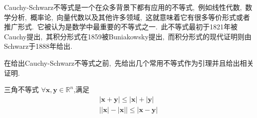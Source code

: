Cauchy-Schwarz不等式是一个在众多背景下都有应用的不等式,\ 例如线性代数,\ 数学分析,\ 概率论,\ 向量代数以及其他许多领域,\ 这就意味着它有很多等价形式或者推广形式.\ 它被认为是数学中最重要的不等式之一.\ 此不等式最初于1821年被Cauchy提出,\ 其积分形式在1859被Buniakowsky提出,\ 而积分形式的现代证明则由Schwarz于1888年给出.\ 

在给出Cauchy-Schwarz不等式之前,\ 先给出几个常用不等式作为引理并且给出相关证明.\ 
\begin{lemma}{三角不等式}
$\forall \boldsymbol{x},\boldsymbol{y}\in\mathbb{R}^n$,满足
\begin{equation}
\begin{aligned}
|\boldsymbol{x}+\boldsymbol{y}| \leqslant |\boldsymbol{x}|+|\boldsymbol{y}| \\
\big| |\boldsymbol{x}|-|\boldsymbol{x}| \big| \leqslant |\boldsymbol{x}-\boldsymbol{y}|
\end{aligned}~
\end{equation}
\end{lemma}
